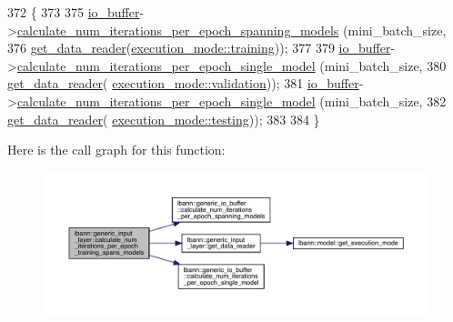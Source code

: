 \begin{DoxyCode}
372                                                                                      \{
373 
375     \hyperlink{classlbann_1_1generic__input__layer_a9dfe8b9afaebc7a5bcb0177ee2ab428f}{io\_buffer}->\hyperlink{classlbann_1_1generic__io__buffer_ac943184cf364f7922648e3acb760b41e}{calculate\_num\_iterations\_per\_epoch\_spanning\_models}
      (mini\_batch\_size,
376                                                                   
      \hyperlink{classlbann_1_1generic__input__layer_aba732becdb02627e3ad4493ac19e8fb6}{get\_data\_reader}(\hyperlink{base_8hpp_a2781a159088df64ed7d47cc91c4dc0a8ac185ddac8b5a8f5aa23c5b80bc12d214}{execution\_mode::training}));
377 
379     \hyperlink{classlbann_1_1generic__input__layer_a9dfe8b9afaebc7a5bcb0177ee2ab428f}{io\_buffer}->\hyperlink{classlbann_1_1generic__io__buffer_a4c71135fada7f0da0b315d538d327e59}{calculate\_num\_iterations\_per\_epoch\_single\_model}
      (mini\_batch\_size,
380                                                                \hyperlink{classlbann_1_1generic__input__layer_aba732becdb02627e3ad4493ac19e8fb6}{get\_data\_reader}(
      \hyperlink{base_8hpp_a2781a159088df64ed7d47cc91c4dc0a8aa617908b172c473cb8e8cda059e55bf0}{execution\_mode::validation}));
381     \hyperlink{classlbann_1_1generic__input__layer_a9dfe8b9afaebc7a5bcb0177ee2ab428f}{io\_buffer}->\hyperlink{classlbann_1_1generic__io__buffer_a4c71135fada7f0da0b315d538d327e59}{calculate\_num\_iterations\_per\_epoch\_single\_model}
      (mini\_batch\_size,
382                                                                \hyperlink{classlbann_1_1generic__input__layer_aba732becdb02627e3ad4493ac19e8fb6}{get\_data\_reader}(
      \hyperlink{base_8hpp_a2781a159088df64ed7d47cc91c4dc0a8aae2b1fca515949e5d54fb22b8ed95575}{execution\_mode::testing}));
383 
384   \}
\end{DoxyCode}
Here is the call graph for this function\+:\nopagebreak
\begin{figure}[H]
\begin{center}
\leavevmode
\includegraphics[width=350pt]{classlbann_1_1generic__input__layer_af108a5dc05276bc6bc57b306204b12e4_cgraph}
\end{center}
\end{figure}
